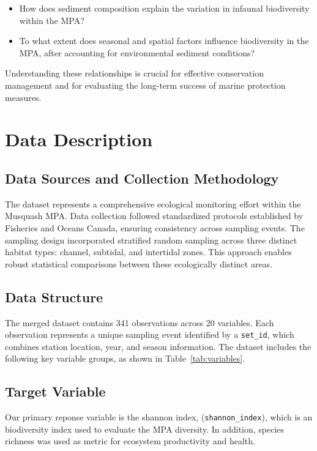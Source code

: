 \documentclass[12pt]{article}
\begin{document}
\begin{itemize}
    \item How does sediment composition explain the variation in infaunal
    biodiversity within the MPA?
    \item To what extent does seasonal and spatial factors influence biodiversity
    in the MPA, after accounting for environmental sediment conditions?
\end{itemize}

\qquad Understanding these relationships is crucial for effective conservation
management and for evaluating the long-term success of marine protection
measures.

\newpage

\section{Data Description}

\subsection{Data Sources and Collection Methodology}

\qquad The dataset represents a comprehensive ecological monitoring effort
within the Musquash MPA. Data collection followed standardized protocols
established by Fisheries and Oceans Canada, ensuring consistency across sampling
events. The sampling design incorporated stratified random sampling across three
distinct habitat types: channel, subtidal, and intertidal zones. This approach
enables robust statistical comparisons between these ecologically distinct
areas.

\subsection{Data Structure}

\qquad The merged dataset contains 341 observations across 20 variables. Each
observation represents a unique sampling event identified by a \texttt{set\_id},
which combines station location, year, and season information. The dataset
includes the following key variable groups, as shown in
Table~\ref{tab:variables}. 

\subsection{Target Variable}

\qquad Our primary reponse variable is the shannon index,
(\texttt{shannon\_index}), which is an biodiversity index used to evaluate the
MPA diversity. In addition, species richness was used as  metric for ecosystem
productivity and health. 
\end{document}
